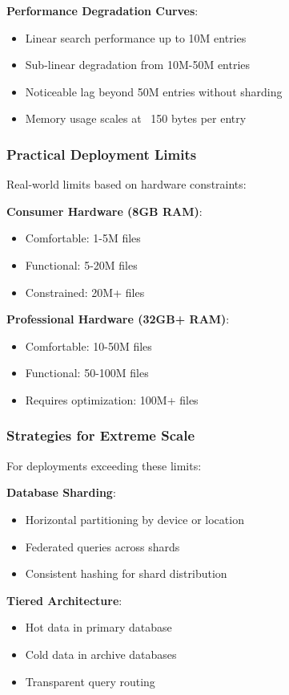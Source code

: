 \documentclass[sigconf]{acmart}
\newcommand{\planned}[1]{#1}
\begin{document}
\textbf{Performance Degradation Curves}:
\begin{itemize}[noitemsep, topsep=0pt]
\item Linear search performance up to 10M entries
\item Sub-linear degradation from 10M-50M entries
\item Noticeable lag beyond 50M entries without sharding
\item Memory usage scales at ~150 bytes per entry
\end{itemize}

\subsubsection{Practical Deployment Limits}
Real-world limits based on hardware constraints:

\textbf{Consumer Hardware (8GB RAM)}:
\begin{itemize}[noitemsep, topsep=0pt]
\item Comfortable: 1-5M files
\item Functional: 5-20M files
\item Constrained: 20M+ files
\end{itemize}

\textbf{Professional Hardware (32GB+ RAM)}:
\begin{itemize}[noitemsep, topsep=0pt]
\item Comfortable: 10-50M files
\item Functional: 50-100M files
\item Requires optimization: 100M+ files
\end{itemize}

\subsubsection{Strategies for Extreme Scale}
For deployments exceeding these limits:

\textbf{\planned{Database Sharding}}:
\begin{itemize}[noitemsep, topsep=0pt]
\item Horizontal partitioning by device or location
\item Federated queries across shards
\item Consistent hashing for shard distribution
\end{itemize}

\textbf{Tiered Architecture}:
\begin{itemize}[noitemsep, topsep=0pt]
\item Hot data in primary database
\item Cold data in archive databases
\item Transparent query routing
\end{itemize}
\end{document}
